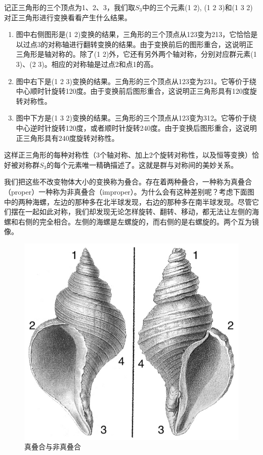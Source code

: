 \documentclass[b5paper]{ctexart}
\begin{document}
记正三角形的三个顶点为1、2、3，我们取$S_3$中的三个元素(1 2), (1 2 3)和(1 3 2)对正三角形进行变换看看产生什么结果。

\begin{enumerate}
\item 图中右侧图形是(1 2)变换的结果，三角形的三个顶点从123变为213，它恰恰是以过点3的对称轴进行翻转变换的结果。由于变换前后的图形重合，这说明正三角形是轴对称的。除了(1 2)外，它还有另外两个轴对称，分别对应群元素(1 3)、(2 3)。相应的对称轴是过点2和点1的高。

\item 图中右下是(1 2 3)变换的结果。三角形的三个顶点从123变为231。它等价于绕中心顺时针旋转120度。由于变换前后图形重合，这说明正三角形具有120度旋转对称性。

\item 图中下方是(1 3 2)变换的结果。三角形的三个顶点从123变为312。它等价于绕中心逆时针旋转120度，或者顺时针旋转240度。由于变换后图形重合，这说明正三角形具有240度旋转对称性。
\end{enumerate}

这样正三角形的每种对称性（3个轴对称、加上2个旋转对称性，以及恒等变换）恰好被对称群$S_3$的每个元素唯一精确描述了。这就是群与对称间的美妙关系。

我们把这些不改变物体大小的变换称为叠合。存在着两种叠合，一种称为真叠合（proper）一种称为非真叠合（improper）。为什么会有这种差别呢？考虑下面图中的两种海螺，左边的那种多在北半球发现，右边的那种多在南半球发现。尽管它们摆在一起如此对称，我们却发现无论怎样旋转、翻转、移动，都无法让左侧的海螺和右侧的完全相合。左侧的海螺是左螺旋的，而右侧的是右螺旋的。两个互为镜像。

\begin{figure}[htbp]
 \centering
 \includegraphics[scale=0.3]{img/chirality.jpg}
 \caption{真叠合与非真叠合}
 \label{fig:chirality}
\end{figure}
\end{document}
